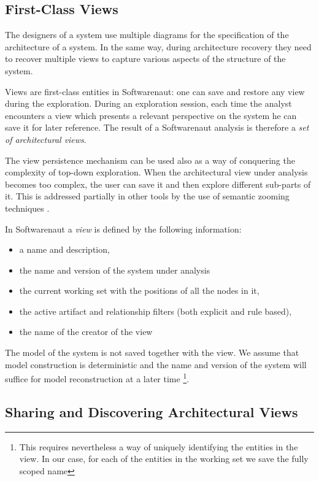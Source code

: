 \documentclass[preprint,12pt]{elsarticle}
\begin{document}
\subsection {First-Class Views}

The designers of a system use multiple diagrams for the specification of the architecture of a system. In the same way, during architecture recovery they need to recover multiple views to capture various aspects of the structure of the system. 

Views are first-class entities in Softwarenaut: one can save and restore any view during the exploration. During an exploration session, each time the analyst encounters a view which presents a relevant perspective on the system he can save it for later reference. The result of a Softwarenaut analysis is therefore a {\em set of architectural views}.

The view persistence mechanism can be used also as a way of conquering the complexity of top-down exploration. When the architectural view under analysis becomes too complex, the user can save it and then explore different sub-parts of it. This is addressed partially in other tools by the use of semantic zooming techniques \cite{storey-shrimp}. 

In Softwarenaut a {\em view} is defined by the following information: 

\begin{itemize}
\item a name and description,
\item the name and version of the system under analysis
\item the current working set with the positions of all the nodes in it,
\item the active artifact and relationship filters (both explicit and rule based), 
\item the name of the creator of the view
\end{itemize}

The model of the system is not saved together with the view. We assume that model construction is deterministic and the name and version of the system will suffice for model reconstruction at a later time \footnote{This requires nevertheless a way of uniquely identifying the entities in the view. In our case, for each of the entities in the working set we save the fully scoped name}.

\subsection {Sharing and Discovering Architectural Views}
\end{document}
